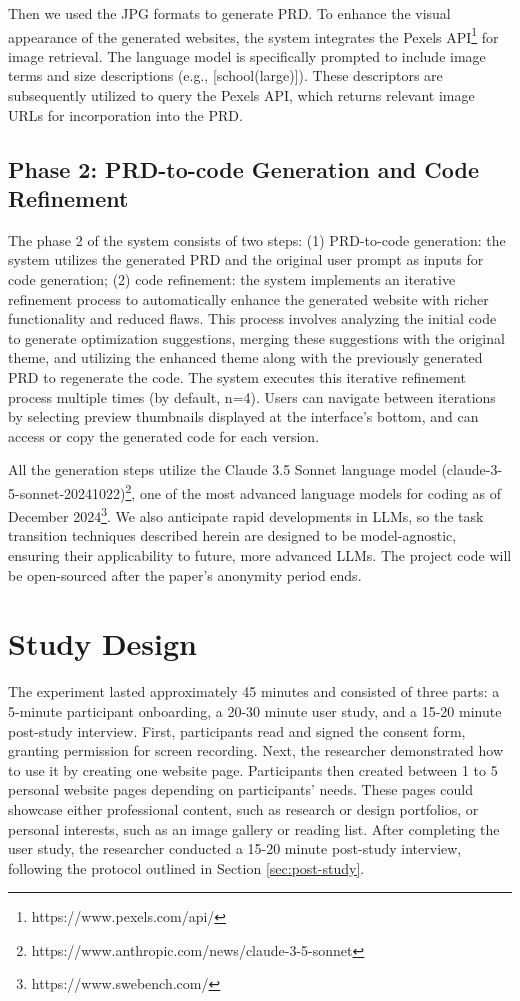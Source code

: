 Then we used the JPG formats to generate PRD. To enhance the visual appearance of the generated websites, the system integrates the Pexels API\footnote{https://www.pexels.com/api/} for image retrieval. The language model is specifically prompted to include image terms and size descriptions (e.g., [school(large)]). These descriptors are subsequently utilized to query the Pexels API, which returns relevant image URLs for incorporation into the PRD.

\subsection{Phase 2: PRD-to-code Generation and Code Refinement}

The phase 2 of the system consists of two steps: (1) PRD-to-code generation: the system utilizes the generated PRD and the original user prompt as inputs for code generation; (2) code refinement: the system implements an iterative refinement process to automatically enhance the generated website with richer functionality and reduced flaws. This process involves analyzing the initial code to generate optimization suggestions, merging these suggestions with the original theme, and utilizing the enhanced theme along with the previously generated PRD to regenerate the code. The system executes this iterative refinement process multiple times (by default, n=4). Users can navigate between iterations by selecting preview thumbnails displayed at the interface's bottom, and can access or copy the generated code for each version.

All the generation steps utilize the Claude 3.5 Sonnet language model (claude-3-5-sonnet-20241022)\footnote{https://www.anthropic.com/news/claude-3-5-sonnet}, one of the most advanced language models for coding as of December 2024\footnote{https://www.swebench.com/}. We also anticipate rapid developments in LLMs, so the task transition techniques described herein are designed to be model-agnostic, ensuring their applicability to future, more advanced LLMs. The project code will be open-sourced after the paper's anonymity period ends.

\section{Study Design}

The experiment lasted approximately 45 minutes and consisted of three parts: a 5-minute participant onboarding, a 20-30 minute user study, and a 15-20 minute post-study interview. First, participants read and signed the consent form, granting permission for screen recording. Next, the researcher demonstrated how to use it by creating one website page. Participants then created between 1 to 5 personal website pages depending on participants' needs. These pages could showcase either professional content, such as research or design portfolios, or personal interests, such as an image gallery or reading list. After completing the user study, the researcher conducted a 15-20 minute post-study interview, following the protocol outlined in Section \ref{sec:post-study}.


